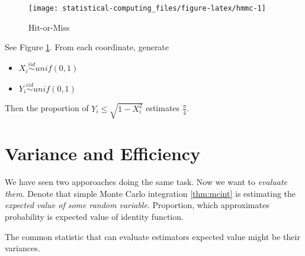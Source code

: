\documentclass[]{book}
\newenvironment{Shaded}{\begin{snugshade}}{\end{snugshade}}
\newcommand{\CommentTok}[1]{\textcolor[rgb]{0.56,0.35,0.01}{\textit{#1}}}
\newcommand{\DataTypeTok}[1]{\textcolor[rgb]{0.13,0.29,0.53}{#1}}
\newcommand{\DecValTok}[1]{\textcolor[rgb]{0.00,0.00,0.81}{#1}}
\newcommand{\KeywordTok}[1]{\textcolor[rgb]{0.13,0.29,0.53}{\textbf{#1}}}
\newcommand{\NormalTok}[1]{#1}
\newcommand{\OperatorTok}[1]{\textcolor[rgb]{0.81,0.36,0.00}{\textbf{#1}}}
\newcommand{\StringTok}[1]{\textcolor[rgb]{0.31,0.60,0.02}{#1}}
\providecommand{\tightlist}{%
  \setlength{\itemsep}{0pt}\setlength{\parskip}{0pt}}
\theoremstyle{definition}
\theoremstyle{definition}
\theoremstyle{definition}
\theoremstyle{remark}
\begin{document}
\begin{figure}[H]

{\centering \texttt{[image: statistical-computing\_files/figure-latex/hmmc-1]} 

}

\caption{Hit-or-Miss}\label{fig:hmmc}
\end{figure}

See Figure \ref{fig:hmmc}. From each coordinate, generate

\begin{itemize}
\tightlist
\item
  \(X_i \stackrel{iid}{\sim}unif(0,1)\)
\item
  \(Y_i \stackrel{iid}{\sim}unif(0,1)\)
\end{itemize}

Then the proportion of \(Y_i \le \sqrt{1 - X_i^2}\) estimates \(\frac{\pi}{4}\).

\begin{Shaded}
\end{Shaded}

\hypertarget{variance-and-efficiency}{%
\section{Variance and Efficiency}\label{variance-and-efficiency}}

We have seen two apporoaches doing the same task. Now we want to \emph{evaluate them}. Denote that simple Monte Carlo integration \ref{thm:mcint} is estimating the \emph{expected value of some random variable}. Proportion, which approximates probability is expected value of identity function.

The common statistic that can evaluate estimators expected value might be their variances.
\end{document}
